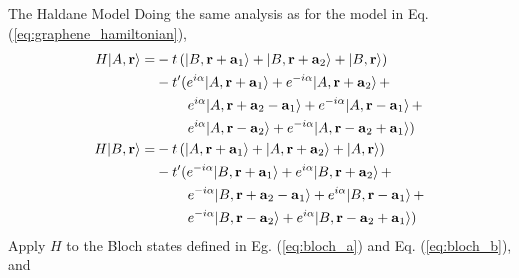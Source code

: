 \documentclass[a4paper,12pt]{article}
\renewcommand{\vec}[1]{\boldsymbol{\mathbf{#1}}}
\begin{document}
\begin{section}{The Haldane Model}
\noindent Doing the same analysis as for the model in Eq. (\ref{eq:graphene_hamiltonian}),
\begin{align}
H|A,\vec{r} \rangle =
&-t \left( |B,\vec{r}+\vec{a}_1 \rangle + |B,\vec{r}+\vec{a}_2 \rangle + |B,\vec{r} \rangle \right) \notag \\
&- t' ( e^{i \alpha} |A,\vec{r}+\vec{a}_1 \rangle + e^{-i \alpha} |A,\vec{r}+\vec{a}_2 \rangle \, + \notag \\
&\qquad \, \, e^{i \alpha} |A,\vec{r}+\vec{a}_2 - \vec{a}_1 \rangle + e^{-i \alpha} |A,\vec{r} - \vec{a}_1 \rangle \, + \notag \\
&\qquad \, \, e^{i \alpha} |A,\vec{r}-\vec{a}_2 \rangle + e^{-i \alpha} |A,\vec{r} - \vec{a}_2 + \vec{a}_1 \rangle ) \\
H|B,\vec{r} \rangle =
&-t \left( |A,\vec{r}+\vec{a}_1 \rangle + |A,\vec{r}+\vec{a}_2 \rangle + |A,\vec{r} \rangle \right) \notag \\
&- t' ( e^{-i \alpha} |B,\vec{r}+\vec{a}_1 \rangle + e^{i \alpha} |B,\vec{r}+\vec{a}_2 \rangle \notag \, + \\
&\qquad \, \, e^{-i \alpha} |B,\vec{r}+\vec{a}_2 - \vec{a}_1 \rangle + e^{i \alpha} |B,\vec{r} - \vec{a}_1 \rangle \, + \notag \\
&\qquad \, \, e^{-i \alpha} |B,\vec{r}-\vec{a}_2 \rangle + e^{i \alpha} |B,\vec{r} - \vec{a}_2 + \vec{a}_1 \rangle )
\end{align}
Apply $H$ to the Bloch states defined in Eg. (\ref{eq:bloch_a}) and Eq. (\ref{eq:bloch_b}), and 

\end{section}
\end{document}

